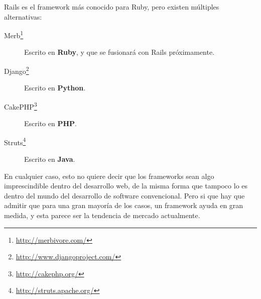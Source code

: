 Rails es el framework más conocido para Ruby, pero existen múltiples alternativas:

\begin{description}
  \item[Merb\footnote{\url{http://merbivore.com/}}] Escrito en \textbf{Ruby}, y que se fusionará con Rails próximamente.
  \item[Django\footnote{\url{http://www.djangoproject.com/}}] Escrito en \textbf{Python}.
  \item[CakePHP\footnote{\url{http://cakephp.org/}}] Escrito en \textbf{PHP}.
  \item[Struts\footnote{\url{http://struts.apache.org/}}] Escrito en \textbf{Java}.
\end{description}

En cualquier caso, esto no quiere decir que los frameworks sean algo imprescindible dentro del desarrollo web, de la misma forma que tampoco lo es dentro del mundo del desarrollo de software convencional. Pero si que hay que admitir que para una gran mayoría de los casos, un framework ayuda en gran medida, y esta parece ser la tendencia de mercado actualmente.



